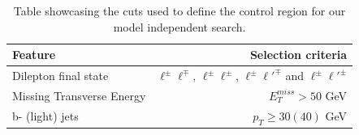 \documentclass[14pt, a4paper]{book}
\begin{document}
\begin{table}[!h]
    \centering\caption[Control region for model-indepentent search]{Table showcasing the cuts used to define the control region for our model independent search.}
    \begin{tabular}{l|r}\midrule\midrule
        Feature                                                                 & Selection criteria        \\\midrule
        Dilepton final state                                                    & $\ell^\pm \ell^\mp$, $\ell^\pm \ell^\pm$, $\ell^\pm \ell'^\mp$ and $\ell^\pm \ell'^\pm$    \\
        Missing Transverse Energy                                               & $E_T^{miss} > 50$ GeV     \\
        b- (light) jets                                                         & $p_T \ge 30(40)$ GeV     \\\midrule\midrule
    \end{tabular}
    \label{tab:CR_cuts}
\end{table}
\end{document}
